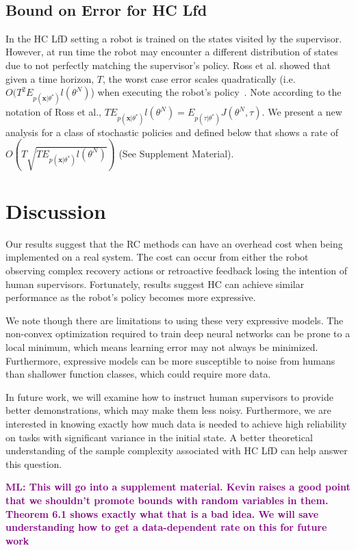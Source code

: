 \documentclass[10pt, conference]{ieeeconf}      %
\newcommand{\bx}{\mathbf{x}}
\newcommand{\mlnote}[1]{\ifthenelse{ \boolean{include-notes}}%
 {\textcolor{purple}{\textbf{ML: #1}}}{}}
\begin{document}
\
\subsection{Bound on Error for HC Lfd}
In the HC LfD setting a robot is trained on the states visited by the supervisor. However, at run time the robot may encounter a different distribution of states due to not perfectly matching the supervisor's policy. Ross et al. showed that given a time horizon, $T$, the worst case error scales quadratically (i.e. $O(T^2E_{p(\bx|\theta^*)} l(\theta^N)$) when executing the robot's policy~\cite{ross2010efficient}. Note according to the notation of Ross et al., $TE_{p(\bx|\theta^*)} l(\theta^N) = E_{p(\tau|\theta^*)} J(\theta^N, \tau)$. We present a new analysis for a class of stochastic policies and  defined below that shows a rate of $O(T\sqrt{TE_{p(\bx|\theta^*)} l(\theta^N)})$ (See Supplement Material). 


\section{Discussion}
 Our results suggest that the RC methods can have an overhead cost when being implemented on a real system. The cost can occur from either the robot observing complex recovery actions or retroactive feedback losing the intention of human supervisors. Fortunately, results suggest HC can achieve similar performance as the robot's policy becomes more expressive. 

We note though there are limitations to using these very expressive models. The non-convex optimization required to train deep neural networks can be prone to a local minimum, which means learning error may not always be minimized. Furthermore, expressive models can be more susceptible to noise from humans than shallower function classes, which could require more data. 

In future work, we will examine how to instruct human supervisors to provide better demonstrations, which may make them less noisy. Furthermore, we are interested in knowing exactly how much data is needed to achieve high reliability on tasks with significant variance in the initial state. A better theoretical understanding of the sample complexity associated with HC LfD can help answer this question. 








\appendix
\mlnote{This will go into a supplement material. Kevin raises a good point that we shouldn't promote bounds with random variables in them. Theorem 6.1 shows exactly what that is a bad idea. We will save understanding how to get a data-dependent rate on this for future work}
\end{document}
